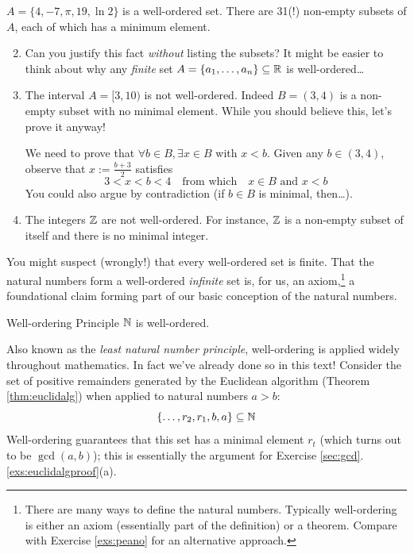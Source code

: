 \begin{examples}{}{}
	\exstart $A=\{4,-7,\pi,19,\ln 2\}$ is a well-ordered set. There are 31(!) non-empty subsets of $A$, each of which has a minimum element.\vspace{-5pt}
	\begin{enumerate}\setcounter{enumi}{1}
	  \item[] Can you justify this fact \emph{without} listing the subsets? It might be easier to think about why any \emph{finite} set $A=\{a_1,\ldots,a_n\}\subseteq\mathbb{R}$ is well-ordered\ldots 
	  
	  \item The interval $A=[3,10)$ is not well-ordered. Indeed $B=(3,4)$ is a non-empty subset with no minimal element. While you should believe this, let's prove it anyway!\par
	  We need to prove that $\forall b\in B, \exists x\in B$ with $x<b$. Given any $b\in(3,4)$, observe that $x:=\frac{b+3}2$ satisfies
	  \[
	  	3<x<b<4 \quad\text{from which}\quad x\in B\text{ and }x<b
	  \]
	  You could also argue by contradiction (if $b\in B$ is minimal, then\ldots).
	  
	  \item The integers $\mathbb{Z}$ are not well-ordered. For instance, $\mathbb{Z}$ is a non-empty subset of itself and there is no minimal integer.
	\end{enumerate}
\end{examples}

You might suspect (wrongly!) that every well-ordered set is finite. That the natural numbers form a well-ordered \emph{infinite} set is, for us, an axiom,\footnote{%
	There are many ways to define the natural numbers. Typically well-ordering is either an axiom (essentially part of the definition) or a theorem. Compare with Exercise \ref{exs:peano} for an alternative approach.
}
a foundational claim forming part of our basic conception of the natural numbers.

\begin{axiom}{Well-ordering Principle}{}
	$\mathbb{N}$ is well-ordered.
\end{axiom}


Also known as the \emph{least natural number principle}, well-ordering is applied widely throughout mathematics. In fact we've already done so in this text! Consider the set of positive remainders generated by the Euclidean algorithm (Theorem \ref{thm:euclidalg}) when applied to natural numbers $a>b$:
\[
	\{\ldots,r_2,r_1,b,a\}\subseteq\mathbb{N}
\]
Well-ordering guarantees that this set has a minimal element $r_t$ (which turns out to be $\gcd(a,b)$); this is essentially the argument for Exercise \ref*{sec:gcd}.\ref{exs:euclidalgproof}(a).

